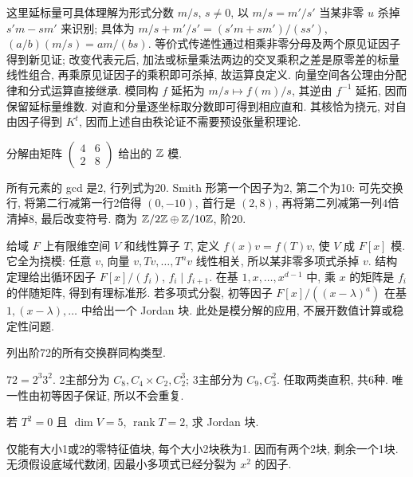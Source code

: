 这里延标量可具体理解为形式分数 $m/s$, $s\ne0$, 以 $m/s=m'/s'$ 当某非零 $u$ 杀掉 $s'm-sm'$ 来识别; 具体为 $m/s+m'/s'=(s'm+sm')/(ss')$, $(a/b)(m/s)=am/(bs)$. 等价式传递性通过相乘非零分母及两个原见证因子得到新见证; 改变代表元后, 加法或标量乘法两边的交叉乘积之差是原零差的标量线性组合, 再乘原见证因子的乘积即可杀掉, 故运算良定义. 向量空间各公理由分配律和分式运算直接继承. 模同构 $f$ 延拓为 $m/s\mapsto f(m)/s$, 其逆由 $f^{-1}$ 延拓, 因而保留延标量维数. 对直和分量逐坐标取分数即可得到相应直和. 其核恰为挠元, 对自由因子得到 $K^t$, 因而上述自由秩论证不需要预设张量积理论.
\begin{example}分解由矩阵 $\begin{pmatrix}4&6\\2&8\end{pmatrix}$ 给出的 $\mathbb Z$ 模.\end{example}
\begin{solution}
所有元素的 gcd 是2, 行列式为20. Smith 形第一个因子为2, 第二个为10: 可先交换行, 将第二行减第一行2倍得 $(0,-10)$, 首行是 $(2,8)$, 再将第二列减第一列4倍清掉8, 最后改变符号. 商为 $\mathbb Z/2\mathbb Z\oplus\mathbb Z/10\mathbb Z$, 阶20.
\end{solution}
给域 $F$ 上有限维空间 $V$ 和线性算子 $T$, 定义 $f(x)v=f(T)v$, 使 $V$ 成 $F[x]$ 模. 它全为挠模: 任意 $v$, 向量 $v,Tv,\ldots,T^nv$ 线性相关, 所以某非零多项式杀掉 $v$. 结构定理给出循环因子 $F[x]/(f_i)$, $f_i\mid f_{i+1}$. 在基 $1,x,\ldots,x^{d-1}$ 中, 乘 $x$ 的矩阵是 $f_i$ 的伴随矩阵, 得到有理标准形. 若多项式分裂, 初等因子 $F[x]/((x-\lambda)^a)$ 在基 $1,(x-\lambda),\ldots$ 中给出一个 Jordan 块. 此处是模分解的应用, 不展开数值计算或稳定性问题.
\begin{exercise}列出阶72的所有交换群同构类型.\end{exercise}
\begin{solution}
$72=2^3 3^2$. 2主部分为 $C_8,C_4\times C_2,C_2^3$; 3主部分为 $C_9,C_3^2$. 任取两类直积, 共6种. 唯一性由初等因子保证, 所以不会重复.
\end{solution}
\begin{exercise}若 $T^2=0$ 且 $\dim V=5$, $\operatorname{rank}T=2$, 求 Jordan 块.\end{exercise}
\begin{solution}
仅能有大小1或2的零特征值块, 每个大小2块秩为1. 因而有两个2块, 剩余一个1块. 无须假设底域代数闭, 因最小多项式已经分裂为 $x^2$ 的因子.
\end{solution}
